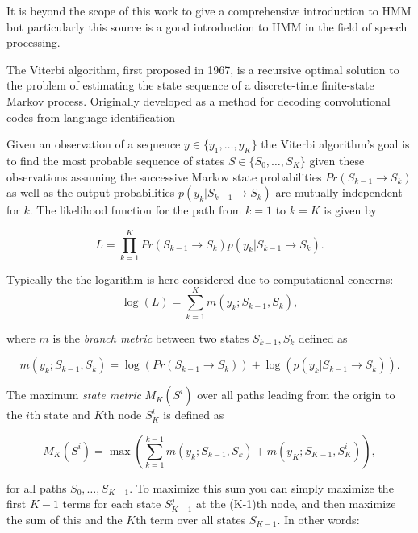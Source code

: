 It is beyond the scope of this work to give a comprehensive introduction to HMM but particularly this source \cite{Rabiner1989} is a good introduction to HMM in the field of speech processing.

The Viterbi algorithm, first proposed in 1967\cite{Viterbi1967}, is a recursive optimal solution to the problem of estimating the state sequence of a discrete-time finite-state Markov process\cite{Forney1973}. Originally developed as a method for decoding convolutional codes
from language identification \cite{Nagarajan2004}

Given an observation of a sequence $y \in \{y_1,\ldots,y_K\}$ the Viterbi algorithm's goal is to find the most probable sequence of states $S \in \{S_0,\ldots,S_K \}$ given these observations assuming the successive Markov state probabilities $Pr(S_{k-1} \rightarrow S_{k})$ as well as the output probabilities $p(y_k | S_{k-1} \rightarrow S_{k})$ are mutually independent for $k$. The likelihood function for the path from $k=1$ to $k=K$ is given by

\begin{equation}\label{eq:viterbiLitRev}
L = \prod_{k=1}^K Pr(S_{k-1} \rightarrow S_{k}) p(y_k | S_{k-1} \rightarrow S_{k}).
\end{equation}

Typically the the logarithm is here considered due to computational concerns:
\begin{equation}\label{eq:viterbiLitRev2}
\log{\left(L\right)} = \sum_{k=1}^K m(y_k ; S_{k-1}, S_{k}),
\end{equation}

where $m$ is the \emph{branch metric} between two states $S_{k-1}, S_{k}$ defined as

\begin{equation}\label{eq:viterbiLitRev3}
m(y_k ; S_{k-1}, S_{k}) = \log{\left( Pr(S_{k-1} \rightarrow S_{k}) \right)} + \log{\left( p(y_k | S_{k-1} \rightarrow S_{k}) \right)}.
\end{equation}

The maximum \emph{state metric} $M_K(S^i)$ over all paths leading from the origin to the $i$th state and $K$th node $S_K^i$ is defined as

\begin{equation}\label{eq:viterbiLitRev4}
M_K(S^i) = \max \left( \sum_{k=1}^{k-1} m(y_k ; S_{k-1}, S_{k}) + m(y_K ; S_{K-1}, S_{K}^i)\right),
\end{equation}

for all paths $S_0,\ldots, S_{K-1}$.
To maximize this sum you can simply maximize the first $K-1$ terms for each state $S^j_{K-1}$ at the (K-1)th node, and then maximize the sum of this and the $K$th term over all states $S_{K-1}$. In other words:

